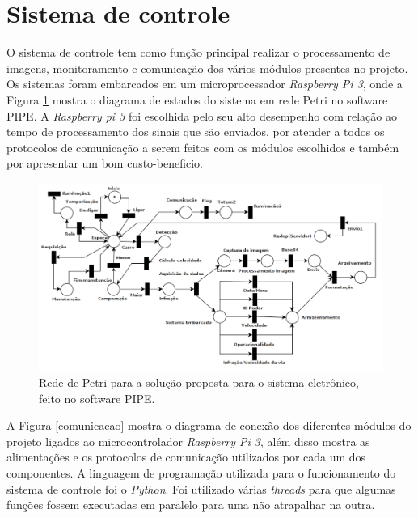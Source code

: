         
\section{Sistema de controle}

O sistema de controle tem como função principal realizar o processamento de imagens, monitoramento e comunicação dos vários módulos presentes no projeto. Os sistemas foram embarcados em um microprocessador \emph{Raspberry Pi 3}, onde a Figura \ref{redePetri} mostra o diagrama de estados do sistema em rede Petri no software PIPE. A \emph{Raspberry pi 3} foi escolhida pelo seu alto desempenho com relação ao tempo de processamento dos sinais que são enviados, por atender a todos os protocolos de comunicação a serem feitos com os módulos escolhidos e também por apresentar um bom custo-beneficio.

\begin{figure}[H]
    \centering
    \includegraphics[scale=0.4]{figuras/Petri.png}
    \caption{Rede de Petri para a solução proposta para o sistema eletrônico, feito no software PIPE.}
    \label{redePetri}
\end{figure}

A Figura \ref{comunicacao} mostra o diagrama de conexão dos diferentes módulos do projeto ligados ao microcontrolador \emph{Raspberry Pi 3}, além disso mostra as alimentações e os protocolos de comunicação utilizados por cada um dos componentes. A linguagem de programação utilizada para o funcionamento do sistema de controle foi o \emph{Python}. Foi utilizado várias \emph{threads} para que algumas funções fossem executadas em paralelo para uma não atrapalhar na outra.

